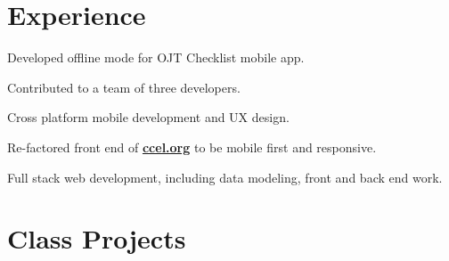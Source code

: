 \documentclass[letterpaper]{deedy-resume} %
\begin{document}
\begin{minipage}[t]{0.66\textwidth} %


\section{Experience}


\vspace{\topsep} %
\begin{tightitemize}
\item Developed offline mode for OJT Checklist mobile app.
\item Contributed to a team of three developers.
\item Cross platform mobile development and UX design.
\end{tightitemize}

\sectionspace %



\begin{tightitemize}

\item Re-factored front end of \textbf{\href{http://www.ccel.org}{ccel.org}} to be mobile first and responsive.
\item Full stack web development, including data modeling, front and back end work.

\end{tightitemize}

\sectionspace %


\section{Class Projects}


\end{minipage}
\end{document}
